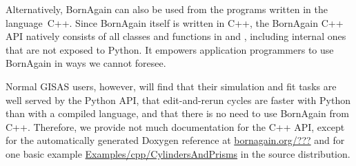 Alternatively, BornAgain can also be used from the programs written
in the language~C++.
Since BornAgain itself is written in C++,
%
the BornAgain C++ API natively consists of
all classes and functions in  and ,
%
%
including internal ones that are not exposed to Python.
It empowers application programmers to use BornAgain
in ways we cannot foresee.

Normal GISAS users, however, will find that their simulation and fit tasks
are well served by the Python API,
that edit-and-rerun cycles are faster with Python than with a compiled language,
and that there is no need to use BornAgain from C++.
Therefore, we provide not much documentation for the C++ API,
except for the automatically generated Doxygen reference at
\url{bornagain.org/???} and
for one basic example \url{Examples/cpp/CylindersAndPrisms}
in the source distribution.


